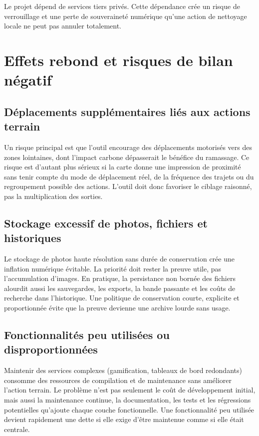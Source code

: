 \documentclass[
  10pt,
  a4paper,
  DIV=11,
  numbers=noendperiod,
  oneside]{scrreprt}
\begin{document}
Le projet dépend de services tiers privés. Cette dépendance crée un
risque de verrouillage et une perte de souveraineté numérique qu'une
action de nettoyage locale ne peut pas annuler totalement.

\section{Effets rebond et risques de bilan
négatif}\label{effets-rebond-et-risques-de-bilan-nuxe9gatif}

\subsection{Déplacements supplémentaires liés aux actions
terrain}\label{duxe9placements-suppluxe9mentaires-liuxe9s-aux-actions-terrain}

Un risque principal est que l'outil encourage des déplacements motorisés
vers des zones lointaines, dont l'impact carbone dépasserait le bénéfice
du ramassage. Ce risque est d'autant plus sérieux si la carte donne une
impression de proximité sans tenir compte du mode de déplacement réel,
de la fréquence des trajets ou du regroupement possible des actions.
L'outil doit donc favoriser le ciblage raisonné, pas la multiplication
des sorties.

\subsection{Stockage excessif de photos, fichiers et
historiques}\label{stockage-excessif-de-photos-fichiers-et-historiques}

Le stockage de photos haute résolution sans durée de conservation crée
une inflation numérique évitable. La priorité doit rester la preuve
utile, pas l'accumulation d'images. En pratique, la persistance non
bornée des fichiers alourdit aussi les sauvegardes, les exports, la
bande passante et les coûts de recherche dans l'historique. Une
politique de conservation courte, explicite et proportionnée évite que
la preuve devienne une archive lourde sans usage.

\subsection{Fonctionnalités peu utilisées ou
disproportionnées}\label{fonctionnalituxe9s-peu-utilisuxe9es-ou-disproportionnuxe9es}

Maintenir des services complexes (gamification, tableaux de bord
redondants) consomme des ressources de compilation et de maintenance
sans améliorer l'action terrain. Le problème n'est pas seulement le coût
de développement initial, mais aussi la maintenance continue, la
documentation, les tests et les régressions potentielles qu'ajoute
chaque couche fonctionnelle. Une fonctionnalité peu utilisée devient
rapidement une dette si elle exige d'être maintenue comme si elle était
centrale.
\end{document}
